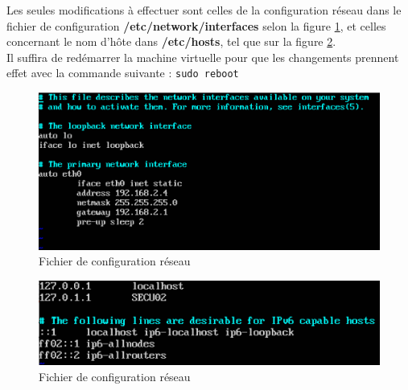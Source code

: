 \indent Les seules modifications à effectuer sont celles de la configuration réseau dans le fichier de configuration \textbf{/etc/network/interfaces} selon la figure \ref{graylog_screenshots/1.png}, et celles concernant le nom d'hôte dans \textbf{/etc/hosts}, tel que sur la figure \ref{graylog_screenshots/2.png}. \\

\indent Il suffira de redémarrer la machine virtuelle pour que les changements prennent effet avec la commande suivante : \texttt{sudo reboot}

\begin{figure}[h!]
    \begin{center}
        \includegraphics[scale=1]{graylog_screenshots/1.png}
        \caption{Fichier de configuration réseau}
        \label{graylog_screenshots/1.png}
    \end{center}
\end{figure}

\begin{figure}[h!]
    \begin{center}
        \includegraphics[scale=1.2]{graylog_screenshots/2.png}
        \caption{Fichier de configuration réseau}
        \label{graylog_screenshots/2.png}
    \end{center}
\end{figure}